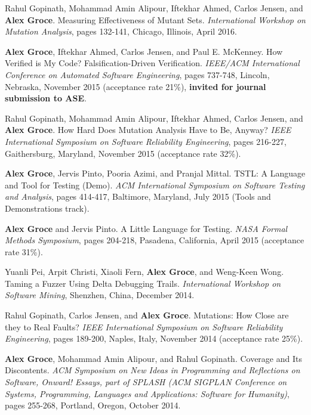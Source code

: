 \documentclass[ComputerScience]{vita}
\begin{document}
\begin{vita}
\begin{Refereed Conference and Workshop Publications}
\item Rahul Gopinath, Mohammad Amin Alipour, Iftekhar Ahmed, Carlos Jensen, and {\bf Alex Groce}.
\newblock Measuring Effectiveness of Mutant Sets.
\newblock \emph{International Workshop on Mutation Analysis}, pages 132-141, Chicago, Illinois, April 2016.

\item {\bf Alex Groce}, Iftekhar Ahmed, Carlos Jensen, and Paul E. McKenney.
\newblock How Verified is My Code? Falsification-Driven Verification.
\newblock \emph{IEEE/ACM International Conference on Automated Software Engineering}, pages 737-748, Lincoln, Nebraska, November 2015 (acceptance rate 21\%), {\bf invited for journal submission to ASE}.

\item Rahul Gopinath, Mohammad Amin Alipour, Iftekhar Ahmed, Carlos Jensen, and {\bf Alex Groce}.
\newblock How Hard Does Mutation Analysis Have to Be, Anyway?
\newblock \emph{IEEE International Symposium on Software Reliability Engineering}, pages 216-227, Gaithersburg, Maryland, November 2015 (acceptance rate 32\%).


\item {\bf Alex Groce}, Jervis Pinto, Pooria Azimi, and Pranjal Mittal.
\newblock TSTL: A Language and Tool for Testing (Demo).
\newblock \emph{ACM International Symposium on Software Testing and Analysis}, pages 414-417, Baltimore, Maryland, July 2015 (Tools and Demonstrations track). 

\item {\bf Alex Groce} and Jervis Pinto.
\newblock A Little Language for Testing.
\newblock \emph{NASA Formal Methods Symposium}, pages 204-218, Pasadena, California, April 2015 (acceptance rate 31\%).

\item Yuanli Pei, Arpit Christi, Xiaoli Fern, {\bf Alex Groce}, and Weng-Keen Wong.
\newblock Taming a Fuzzer Using Delta Debugging Trails.
\newblock \emph{International Workshop on Software Mining}, Shenzhen, China, December 2014.

\item Rahul Gopinath, Carlos Jensen, and {\bf Alex Groce}.
\newblock Mutations: How Close are they to Real Faults?
\newblock \emph{IEEE International Symposium on Software Reliability Engineering}, pages 189-200, Naples, Italy, November 2014 (acceptance rate 25\%).

\item
{\bf Alex Groce}, Mohammad Amin Alipour, and Rahul Gopinath.
\newblock Coverage and Its Discontents.
\newblock \emph{ACM Symposium on New Ideas in Programming and Reflections on Software, Onward! Essays, part of SPLASH (ACM SIGPLAN Conference on Systems, Programming, Languages and Applications: Software for Humanity)}, pages 255-268, Portland, Oregon, October 2014.


\end{Refereed Conference and Workshop Publications}
\end{vita}
\end{document}
